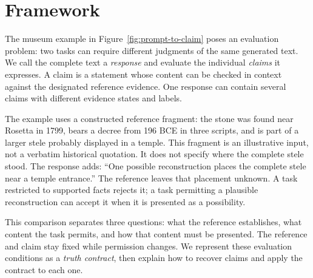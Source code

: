 \documentclass{clv2025}
\begin{document}
\section{Framework}\label{sec:framework}

The museum example in Figure~\ref{fig:prompt-to-claim} poses an evaluation
problem: two tasks can require different judgments of the same generated
text. We call the complete text a \emph{response} and evaluate the individual
\emph{claims} it expresses. A claim is a statement whose content can be
checked in context against the designated reference evidence. One response
can contain several claims with different evidence states and labels.

The example uses a constructed reference fragment: the stone was found
near Rosetta in 1799, bears a decree from 196 BCE in three scripts, and is
part of a larger stele probably displayed in a temple. This fragment is an
illustrative input, not a verbatim historical quotation. It does not specify
where the complete stele stood. The response adds: ``One possible
reconstruction places the complete stele near a temple entrance.'' The
reference leaves that placement unknown. A task restricted to supported
facts rejects it; a task permitting a plausible reconstruction can accept
it when it is presented as a possibility.

This comparison separates three questions: what the reference establishes,
what content the task permits, and how that content must be presented.
The reference and claim stay fixed while permission changes. We represent
these evaluation conditions as a \emph{truth contract}, then explain how
to recover claims and apply the contract to each one.
\end{document}
